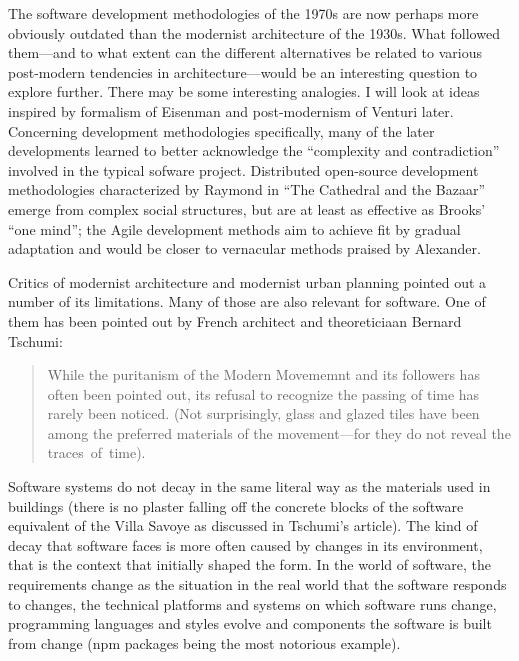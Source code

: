The software development methodologies of the 1970s are now perhaps more obviously outdated
than the modernist architecture of the 1930s. What followed them---and to what extent can the
different alternatives be related to various post-modern tendencies in architecture---would be
an interesting question to explore further. There may be some interesting analogies.
I will look at ideas inspired by formalism of Eisenman and post-modernism of Venturi later.
Concerning development methodologies specifically, many of the later developments learned to
better acknowledge the ``complexity and contradiction'' involved in the typical sofware project.
Distributed open-source development methodologies characterized by Raymond in ``The Cathedral and
the Bazaar'' emerge from complex social structures, but are at least as effective
as Brooks' ``one mind''; the Agile development methods aim to achieve fit by gradual adaptation
and would be closer to vernacular methods praised by Alexander.


Critics of modernist architecture and modernist urban planning pointed out a number
of its limitations. Many of those are also relevant for software. One of them has been
pointed out by French architect and theoreticiaan Bernard Tschumi:

\begin{quote}
While the puritanism of the Modern Movememnt and its followers has often been pointed out,
its refusal to recognize the passing of time has rarely been noticed. (Not surprisingly,
glass and glazed tiles have been among the preferred materials of the movement---for
they do not reveal the traces~of~time).
\end{quote}

Software systems do not decay in the same literal way as the materials used in buildings
(there is no plaster falling off the concrete blocks of the software equivalent of the
Villa Savoye as discussed in Tschumi's article). The kind of decay that software faces is more
often caused by changes in its environment, that is the context that initially shaped the form.
In the world of software, the requirements change as the situation in the real world that the
software responds to changes, the technical platforms and systems on which software runs change,
programming languages and styles evolve and components the software is built from change
(npm packages being the most notorious example).

